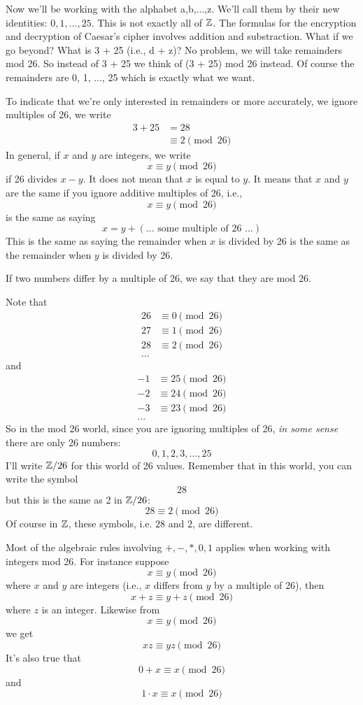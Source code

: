Now we'll be working with the alphabet a,b,...,z.
We'll call them by their new identities: $0,1,...,25$.
This is not exactly all of $\mathbb Z$.
The formulas for the encryption and decryption of Caesar's cipher
involves addition and
substraction.
What if we go beyond? 
What is 3 + 25 (i.e., d + z)?
No problem, we will take remainders mod 26.
So instead of 3 + 25 we think of (3 + 25) mod 26 instead.
Of course the remainders are 0, 1, ..., 25 which is exactly what we want. 

To indicate that we're only interested in remainders or more accurately, we ignore multiples of 26, we write
\begin{align*}
3 + 25 
&= 28 \\
&\equiv 2 \pmod{26}
\end{align*}
In general, if $x$ and $y$ are integers, we write
\[
x \equiv y \pmod{26}
\]
if 26 divides $x - y$.
It does not mean that $x$ is equal to $y$.
It means that $x$ and $y$ are the same if you ignore additive multiples of 26, i.e.,
\[
x \equiv y \pmod{26}
\]
is the same as saying
\[
  x = y + (\text{... some multiple of 26 ...})
\]
This is the same as saying the remainder when $x$ is divided by 26
is the same as the remainder when $y$ is divided by 26.

If two numbers differ by a multiple of 26, we say that they are
 mod 26.

Note that
\begin{align*}
26 &\equiv 0 \pmod{26} \\   
27 &\equiv 1 \pmod{26} \\
  28 &\equiv 2 \pmod{26} \\
  ...
\end{align*}
and
\begin{align*}
-1 &\equiv 25 \pmod{26} \\   
-2 &\equiv 24 \pmod{26} \\
-3 &\equiv 23 \pmod{26} \\
  ...
\end{align*}
So in the mod 26 world, since you are ignoring multiples of 26,
\textit{in some sense} there are only 26 numbers:
\[
  0, 1, 2, 3, ..., 25
\]
I'll write $\mathbb Z/26$ for this world of 26 values.
Remember that in this world, you can write the symbol
\[
  28
\]
but this is the same as 2 in $\mathbb Z/26$:
\[
  28 \equiv 2 \pmod{26}
\]
Of course in $\mathbb Z$, these symbols, i.e. $28$ and $2$, are different.

Most of the algebraic rules involving $+, -, *, 0, 1$ applies when
working with integers mod 26.
For instance suppose 
\[
  x \equiv y \pmod{26}
\]
where $x$ and $y$ are integers
(i.e., $x$ differs from $y$ by a multiple of 26), then
\[
  x + z \equiv y + z\pmod{26}
\]
where $z$ is an integer.
Likewise
from
\[
  x \equiv y \pmod{26}
\]
we get
\[
  x z \equiv y z \pmod{26}
\]
It's also true that
\[
  0 + x \equiv x \pmod{26}
\]
and 
\[
  1 \cdot x \equiv x \pmod{26}
\]

